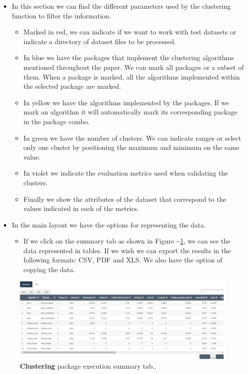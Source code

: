 \documentclass[
]{article}
\providecommand{\tightlist}{%
  \setlength{\itemsep}{0pt}\setlength{\parskip}{0pt}}
\begin{document}
\begin{itemize}
\tightlist
\item
  In this section we can find the different parameters used by the
  clustering function to filter the information.

  \begin{itemize}
  \tightlist
  \item
    Marked in red, we can indicate if we want to work with test datasets
    or indicate a directory of dataset files to be processed.
  \item
    In blue we have the packages that implement the clustering
    algorithms mentioned throughout the paper. We can mark all packages
    or a subset of them. When a package is marked, all the algorithms
    implemented within the selected package are marked.
  \item
    In yellow we have the algorithms implemented by the packages. If we
    mark an algorithm it will automatically mark its corresponding
    package in the package combo.
  \item
    In green we have the number of clusters. We can indicate ranges or
    select only one cluster by positioning the maximum and minimum on
    the same value.
  \item
    In violet we indicate the evaluation metrics used when validating
    the clusters.
  \item
    Finally we show the attributes of the dataset that correspond to the
    values indicated in each of the metrics. \clearpage
  \end{itemize}
\item
  In the main layout we have the options for representing the data.

  \begin{itemize}
  \tightlist
  \item
    If we click on the summary tab as shown in Figure
    \textasciitilde{}\ref{tab_summary}, we can see the data represented
    in tables. If we wish we can export the results in the following
    formats: CSV, PDF and XLS. We also have the option of copying the
    data.
  \end{itemize}
\end{itemize}

\begin{figure}
\centering
\includegraphics{img/tab_summary}
\caption{\textbf{Clustering} package execution summary tab..
\label{tab_summary}}
\end{figure}
\end{document}
